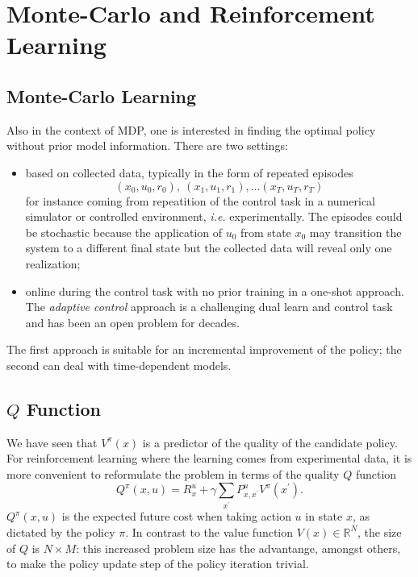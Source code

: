 \chapter{Monte-Carlo and Reinforcement Learning}
\label{chap:mc-rl}

\section{Monte-Carlo Learning}
\label{sec:mc-learning}

Also in the context of MDP, one is interested in finding the optimal policy without prior model information. There are two settings:
\begin{itemize}
\item based on collected data, typically in the form of repeated episodes
  \begin{equation*}
    (x_0,u_0,r_0),\ (x_1,u_1,r_1),\ldots (x_T,u_T,r_T)
  \end{equation*}
  for instance coming from repeatition of the control task in a numerical simulator or controlled environment, \textit{i.e.} experimentally. The episodes could be stochastic because the application of $u_0$ from state $x_0$ may transition the system to a different final state but the collected data will reveal only one realization;
\item online during the control task with no prior training in a one-shot approach. The \emph{adaptive control} approach is a challenging dual learn and control task and has been an open problem for decades.
\end{itemize}
The first approach is suitable for an incremental improvement of the policy; the second can deal with time-dependent models.

\section{$Q$ Function}
\label{sec:Q-function}

We have seen that $V^\pi(x)$ is a predictor of the quality of the candidate policy. For reinforcement learning where the learning comes from experimental data, it is more convenient to reformulate the problem in terms of the quality $Q$ function
\begin{equation}
  \label{eq:q-function-definition}
  Q^\pi(x,u) = R_x^u + \gamma \sum_{x^\prime}P_{x,x^\prime}^u V^\pi (x^\prime).
\end{equation}
$Q^\pi(x,u)$ is the expected future cost when taking action $u$ in state $x$, as dictated by the policy $\pi$. In contrast to the value function $V(x)\in \mathbb{R}^N$, the size of $Q$ is $N\times M$: this increased problem size has the advantange, amongst others, to make the policy update step of the policy iteration trivial.

